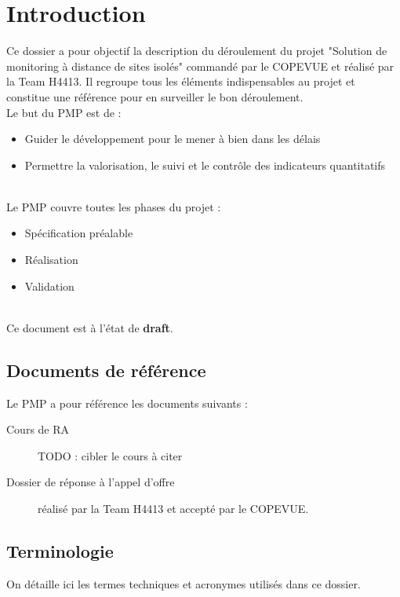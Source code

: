 \section{Introduction}

Ce dossier a pour objectif la description du déroulement du projet
"Solution de monitoring à distance de sites isolés" commandé par le
COPEVUE et réalisé par la Team H4413. Il regroupe tous les éléments
indispensables au projet et constitue une référence pour en surveiller le
bon déroulement.\\

Le but du PMP est de :
\begin{itemize}
\item Guider le développement pour le mener à bien dans les délais
\item Permettre la valorisation, le suivi et le contrôle des indicateurs
quantitatifs
\end{itemize}
\hfill\\

Le PMP couvre toutes les phases du projet :
\begin{itemize}
\item Spécification préalable
\item Réalisation
\item Validation
\end{itemize}

\hfill\\

Ce document est à l'état de \textbf{draft}.

\subsection{Documents de référence}

Le PMP a pour référence les documents suivants :
\begin{description}
\item[Cours de RA] TODO : cibler le cours à citer
\item[Dossier de réponse à l'appel d'offre] réalisé par la Team H4413 et
accepté par le COPEVUE.
\end{description}


\subsection{Terminologie}

On détaille ici les termes techniques et acronymes utilisés dans ce
dossier.

